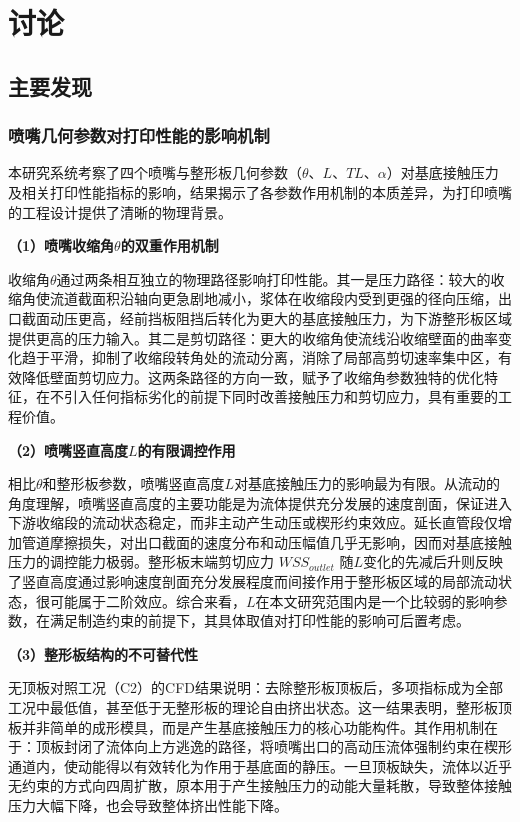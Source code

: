 \chapter{讨\quad 论}\label{chap:discussion}

\section{主要发现}

\subsection{喷嘴几何参数对打印性能的影响机制}

本研究系统考察了四个喷嘴与整形板几何参数（$\theta$、$L$、$TL$、$\alpha$）对基底接触压力及相关打印性能指标的影响，结果揭示了各参数作用机制的本质差异，为打印喷嘴的工程设计提供了清晰的物理背景。

\textbf{（1）喷嘴收缩角$\theta$的双重作用机制}

收缩角$\theta$通过两条相互独立的物理路径影响打印性能。其一是压力路径：较大的收缩角使流道截面积沿轴向更急剧地减小，浆体在收缩段内受到更强的径向压缩，出口截面动压更高，经前挡板阻挡后转化为更大的基底接触压力，为下游整形板区域提供更高的压力输入。其二是剪切路径：更大的收缩角使流线沿收缩壁面的曲率变化趋于平滑，抑制了收缩段转角处的流动分离，消除了局部高剪切速率集中区，有效降低壁面剪切应力。这两条路径的方向一致，赋予了收缩角参数独特的优化特征，在不引入任何指标劣化的前提下同时改善接触压力和剪切应力，具有重要的工程价值。

\textbf{（2）喷嘴竖直高度$L$的有限调控作用}

相比$\theta$和整形板参数，喷嘴竖直高度$L$对基底接触压力的影响最为有限。从流动的角度理解，喷嘴竖直高度的主要功能是为流体提供充分发展的速度剖面，保证进入下游收缩段的流动状态稳定，而非主动产生动压或楔形约束效应。延长直管段仅增加管道摩擦损失，对出口截面的速度分布和动压幅值几乎无影响，因而对基底接触压力的调控能力极弱。整形板末端剪切应力 $WSS_{outlet}$ 随$L$变化的先减后升则反映了竖直高度通过影响速度剖面充分发展程度而间接作用于整形板区域的局部流动状态，很可能属于二阶效应。综合来看，$L$在本文研究范围内是一个比较弱的影响参数，在满足制造约束的前提下，其具体取值对打印性能的影响可后置考虑。

\textbf{（3）整形板结构的不可替代性}

无顶板对照工况（C2）的CFD结果说明：去除整形板顶板后，多项指标成为全部工况中最低值，甚至低于无整形板的理论自由挤出状态。这一结果表明，整形板顶板并非简单的成形模具，而是产生基底接触压力的核心功能构件。其作用机制在于：顶板封闭了流体向上方逃逸的路径，将喷嘴出口的高动压流体强制约束在楔形通道内，使动能得以有效转化为作用于基底面的静压。一旦顶板缺失，流体以近乎无约束的方式向四周扩散，原本用于产生接触压力的动能大量耗散，导致整体接触压力大幅下降，也会导致整体挤出性能下降。

